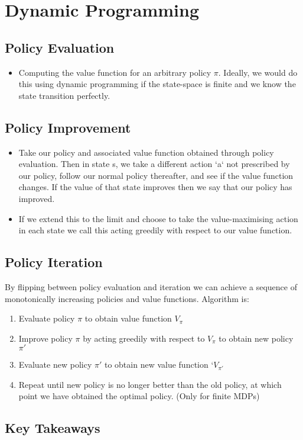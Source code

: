 \section{Dynamic Programming}

\subsection{Policy Evaluation}
\begin{itemize}
\item Computing the value function for an arbitrary policy \(\pi\). Ideally, we would do this using dynamic programming if the state-space is finite and we know the state transition perfectly.
\end{itemize}


\subsection{Policy Improvement}
\begin{itemize}
\item Take our policy and associated value function obtained through policy evaluation. Then in state s, we take a different action `a` not prescribed by our policy, follow our normal policy thereafter, and see if the value function changes. If the value of that state improves then we say that our policy has improved.
\item If we extend this to the limit and choose to take the value-maximising action in each state we call this acting greedily with respect to our value function.
\end{itemize}


\subsection{Policy Iteration}
By flipping between policy evaluation and iteration we can achieve a sequence of monotonically increasing policies and value functions. Algorithm is:
\begin{enumerate}
\item Evaluate policy \(\pi\) to obtain value function \(V_\pi\)
\item Improve policy \(\pi\) by acting greedily with respect to \(V_\pi\) to obtain new policy \(\pi'\)
\item Evaluate new policy \(\pi'\) to obtain new value function `\(V_{\pi'}\)
\item Repeat until new policy is no longer better than the old policy, at which point we have obtained the optimal policy. (Only for finite MDPs)
\end{enumerate}

\subsection{Key Takeaways}
